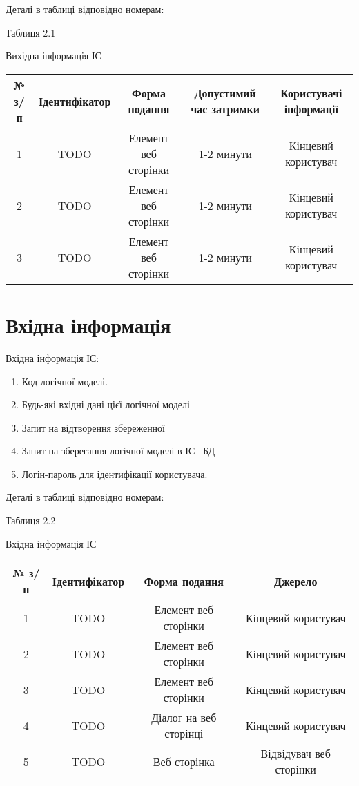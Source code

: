 Деталі в таблиці відповідно номерам:

\begin{flushright}\small {Таблиця 2.1} \end{flushright}
\begin{center}
Вихідна інформація ІС
\small{
\begin{tabular}{ | c | c | c | c | c | }
\hline
 № з/п  & Ідентифікатор & Форма подання & Допустимий час затримки & Користувачі інформації \\ 
\hline
 1 & TODO & Елемент веб сторінки & 1-2 минути & Кінцевий користувач \\  
\hline
 2 & TODO & Елемент веб сторінки & 1-2 минути & Кінцевий користувач \\  
\hline
 3 & TODO & Елемент веб сторінки & 1-2 минути & Кінцевий користувач \\  
\hline
\end{tabular}
}
\end{center}


\section{Вхідна інформація}

Вхідна інформація ІС: 

\begin{enumerate}
	\item Код логічної моделі.
	\item Будь-які вхідні дані цієї логічної моделі
	\item Запит на відтворення збереженної 
	\item Запит на зберегання логічної моделі в ІС \ БД
	\item Логін-пароль для ідентифікації користувача.
\end{enumerate}

Деталі в таблиці відповідно номерам:

\begin{flushright}\small {Таблиця 2.2} \end{flushright}
\begin{center}
Вхідна інформація ІС
\small{
\begin{tabular}{ | c | c | c | c |  }
\hline
 № з/п  & Ідентифікатор & Форма подання & Джерело \\ 
\hline
 1 & TODO & Елемент веб сторінки & Кінцевий користувач \\  
\hline
 2 & TODO & Елемент веб сторінки & Кінцевий користувач \\  
\hline
 3 & TODO & Елемент веб сторінки & Кінцевий користувач \\  
\hline
 4 & TODO & Діалог на веб сторінці & Кінцевий користувач \\  
\hline
 5 & TODO & Веб сторінка & Відвідувач веб сторінки \\  
\hline
\end{tabular}
}
\end{center}


